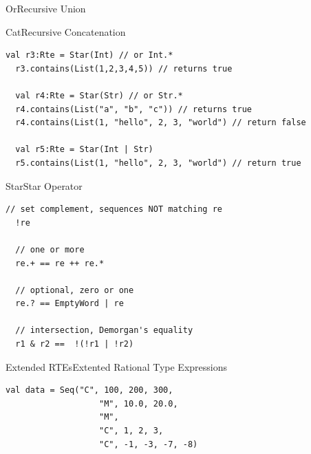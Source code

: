 \begin{frame}{Or}{Recursive Union}
  \usebox\orbox
 \end{frame}

\begin{frame}{Cat}{Recursive Concatenation}
  \usebox\catbox
 \end{frame}



\newsavebox\starbox
\begin{lrbox}{\starbox}
  \begin{minipage}{12cm}
\begin{lstlisting}[style=scalaioScala]
  val r3:Rte = Star(Int) // or Int.*
  r3.contains(List(1,2,3,4,5)) // returns true

  val r4:Rte = Star(Str) // or Str.*
  r4.contains(List("a", "b", "c")) // returns true
  r4.contains(List(1, "hello", 2, 3, "world") // return false

  val r5:Rte = Star(Int | Str) 
  r5.contains(List(1, "hello", 2, 3, "world") // return true
\end{lstlisting}
  \end{minipage}
\end{lrbox}


\begin{frame}{Star}{Star Operator}
  \usebox\starbox
\end{frame}


\newsavebox\extendedbox
\begin{lrbox}{\extendedbox}
  \begin{minipage}{12cm}
\begin{lstlisting}[style=scalaioScala]
  // set complement, sequences NOT matching re
  !re 

  // one or more
  re.+ == re ++ re.*

  // optional, zero or one
  re.? == EmptyWord | re

  // intersection, Demorgan's equality
  r1 & r2 ==  !(!r1 | !r2)
\end{lstlisting}
  \end{minipage}
\end{lrbox}

\begin{frame}{Extended RTEs}{Extented Rational Type Expressions}
  \usebox\extendedbox
\end{frame}


\newsavebox\exampleAbox
\begin{lrbox}{\exampleAbox}
  \begin{minipage}{12cm}
\begin{lstlisting}[style=scalaioScala]
  val data = Seq("C", 100, 200, 300,
                   "M", 10.0, 20.0,
                   "M",
                   "C", 1, 2, 3,
                   "C", -1, -3, -7, -8)
\end{lstlisting}
  \end{minipage}
\end{lrbox}

